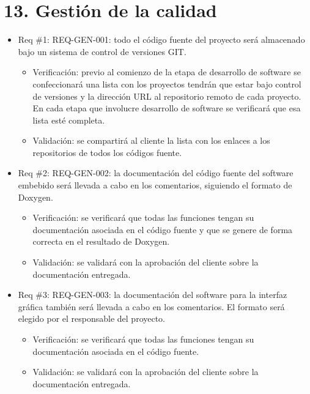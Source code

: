 \documentclass[11pt]{charter}
\begin{document}
\section{13. Gestión de la calidad}
\label{sec:calidad}

\begin{itemize} 
\item Req \#1: REQ-GEN-001: todo el código fuente del proyecto será almacenado bajo un
sistema de control de versiones GIT.
\begin{itemize}
\item Verificación: previo al comienzo de la etapa de desarrollo de software se confeccionará una lista con los proyectos tendrán que estar bajo control de versiones y la dirección URL al repositorio remoto de cada proyecto. En cada etapa que involucre desarrollo de software se verificará que esa lista esté completa.
\item Validación: se compartirá al cliente la lista con los enlaces a los repositorios de todos los códigos fuente.
\end{itemize}
\end{itemize}

\begin{itemize} 
\item Req \#2: REQ-GEN-002: la documentación del código fuente del software embebido será
llevada a cabo en los comentarios, siguiendo el formato de Doxygen.
\begin{itemize}
\item Verificación: se verificará que todas las funciones tengan su documentación asociada en el código fuente y que se genere de forma correcta en el resultado de Doxygen.
\item Validación: se validará con la aprobación del cliente sobre la documentación entregada.
\end{itemize}
\end{itemize}

\begin{itemize} 
\item Req \#3: REQ-GEN-003: la documentación del software para la interfaz gráfica también
será llevada a cabo en los comentarios. El formato será elegido por el responsable del
proyecto.
\begin{itemize}
\item Verificación: se verificará que todas las funciones tengan su documentación asociada en el código fuente.
\item Validación: se validará con la aprobación del cliente sobre la documentación entregada.
\end{itemize}
\end{itemize}
\end{document}
